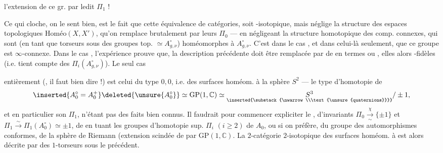 l'extension de ce gr. par ledit $\Pi_1$ !

Ce qui cloche, on le sent bien, est
le fait que cette équivalence de catégories,
soit -isotopique, mais néglige la
structure   des espaces topologiques
 $\mathrm{Homéo}(X,X')$, qu'on remplace
brutalement par leurs $\Pi_0$ --- en négligeant
la structure homotopique des comp.
connexes, qui sont (en tant que torseurs
sous des groupes top. $\simeq A_{g,\nu}^{\circ}$) homéomorphes
à $A_{g,\nu}^{\circ}$. C'est  dans le cas
, et dans celui-là seulement,
que ce groupe est $\infty$-connexe. Dans
le cas , l'expérience prouve que,
la description précédente doit être remplacée
par  de  en termes
 ou ,  elles
 alors  \unsure{$\infty$}-fidèles (i.e. tient compte
des $\Pi_i(A_{g,\nu}^{\circ})$). Le seul cas

entièrement  (, il
faut bien dire !) est celui du type $0,0$, i.e.
des surfaces homéom. à la sphère $S^2$
--- le type d'homotopie de 
\[
\inserted{A_0^\circ=A_0^+}\deleted{\unsure{A_0^\circ}}
\simeq \mathrm{GP}(1,\mathbb C)\simeq
\underset{\inserted{\substack{\nwarrow\\\text{\unsure{quaternions}}}}}{S^3}/\pm1,
\]
et en particulier son $\Pi_1$, n'étant pas des
faits bien connus. Il faudrait pour
commencer  expliciter le
 , d'invariants $\Pi_0\xrightarrow[\sim]{\chi}\{\pm1\}$ et
$\Pi_1\xrightarrow{\sim}\Pi_1(A_0^\circ)\simeq\pm1$,  de 
en tuant les groupes d'homotopie sup.
$\Pi_i$ $(i\geq2)$ de $A_0$, ou si on préfère,
du groupe des automorphismes conformes,
de la sphère de Riemann (extension
scindée de  par $\mathrm{GP}(1,\mathbb C)$.
La $2$-catégorie
$2$-isotopique des surfaces homéom. à 
 est alors décrite par  des
$1$-torseurs sous le  précédent.

